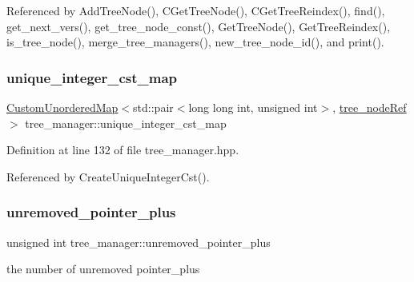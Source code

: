 Referenced by Add\+Tree\+Node(), C\+Get\+Tree\+Node(), C\+Get\+Tree\+Reindex(), find(), get\+\_\+next\+\_\+vers(), get\+\_\+tree\+\_\+node\+\_\+const(), Get\+Tree\+Node(), Get\+Tree\+Reindex(), is\+\_\+tree\+\_\+node(), merge\+\_\+tree\+\_\+managers(), new\+\_\+tree\+\_\+node\+\_\+id(), and print().

\mbox{\label{classtree__manager_a663dfe307bce8efbccb7ad2a7f52023d}} 
\subsubsection{\texorpdfstring{unique\+\_\+integer\+\_\+cst\+\_\+map}{unique\_integer\_cst\_map}}
{\footnotesize\ttfamily \hyperlink{custom__map_8hpp_ad1ed68f2ff093683ab1a33522b144adc}{Custom\+Unordered\+Map}$<$std\+::pair$<$long long int, unsigned int$>$, \hyperlink{tree__node_8hpp_a6ee377554d1c4871ad66a337eaa67fd5}{tree\+\_\+node\+Ref}$>$ tree\+\_\+manager\+::unique\+\_\+integer\+\_\+cst\+\_\+map\hspace{0.3cm}{\ttfamily [private]}}



Definition at line 132 of file tree\+\_\+manager.\+hpp.



Referenced by Create\+Unique\+Integer\+Cst().

\mbox{\label{classtree__manager_a8f14de3b8c460cfbe7abe5792eee137f}} 
\subsubsection{\texorpdfstring{unremoved\+\_\+pointer\+\_\+plus}{unremoved\_pointer\_plus}}
{\footnotesize\ttfamily unsigned int tree\+\_\+manager\+::unremoved\+\_\+pointer\+\_\+plus\hspace{0.3cm}{\ttfamily [private]}}



the number of unremoved pointer\+\_\+plus 



